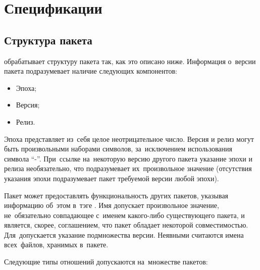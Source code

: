 
\section{Спецификации}

\subsection{Структура пакета}
\label{pkgstruct}

\ds обрабатывает структуру пакета так, как это описано ниже.
Информация о~версии пакета подразумевает наличие следующих компонентов:

\begin{itemize}
\item {Эпоха;}
\item{Версия;}
\item {Релиз.}
\end{itemize}

Эпоха представляет из~себя целое неотрицательное число. 
Версия и релиз могут быть произвольными наборами символов, за~исключением использования символа ``-''.
При~ссылке на~некоторую версию другого пакета указание эпохи и релиза необязательно,
что подразумевает их~произвольное значение 
(отсутствия указания эпохи подразумевает пакет требуемой версии любой эпохи).

Пакет может предоставлять функциональность других пакетов,
указывая информацию об~этом в~тэге \provides.
Имя \provides допускает произвольное значение, не~обязательно совпадающее с~именем какого-либо существующего пакета,
и является, скорее, соглашением, что пакет обладает некоторой совместимостью.
Для~\provides  допускается указание подмножества версии.
Неявными \provides считаются имена всех~файлов, хранимых в~пакете.

Следующие типы отношений допускаются на~множестве пакетов:


